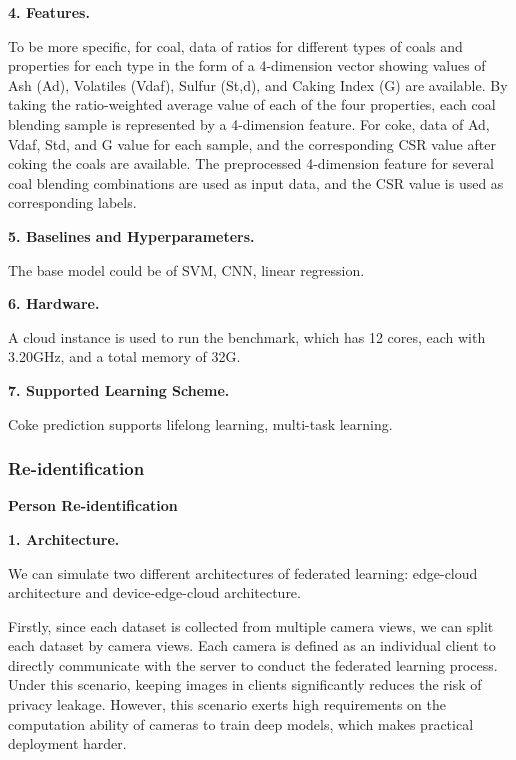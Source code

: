 \textbf{4. Features.}

To be more specific, for coal, data of ratios for different types of coals and properties for each type in the form of a 4-dimension vector showing values of Ash (Ad), Volatiles (Vdaf), Sulfur (St,d), and Caking Index (G) are available. By taking the ratio-weighted average value of each of the four properties, each coal blending sample is represented by a 4-dimension feature. For coke, data of Ad, Vdaf, Std, and G value for each sample, and the corresponding CSR value after coking the coals are available. The preprocessed 4-dimension feature for several coal blending combinations are used as input data, and the CSR value is used as corresponding labels. 

\textbf{5. Baselines and Hyperparameters.}

The base model could be of SVM, CNN, linear regression. 

\textbf{6. Hardware.}

A cloud instance is used to run the benchmark, which has 12 cores, each with 3.20GHz, and a total memory of 32G.

\textbf{7. Supported Learning Scheme.}

Coke prediction supports lifelong learning, multi-task learning. 






\subsubsection{Re-identification}
\textbf{Person Re-identification}

\textbf{1. Architecture.}

We can simulate two different architectures of federated learning: edge-cloud architecture and device-edge-cloud architecture. 

Firstly, since each dataset is collected from multiple camera views, we can split each dataset by camera views. Each camera is defined as an individual client to directly communicate with the server to conduct the federated learning process. Under this scenario, keeping images in clients significantly reduces the risk of privacy leakage. However, this scenario exerts high requirements on the computation ability of cameras to train deep models, which makes practical deployment harder. 

